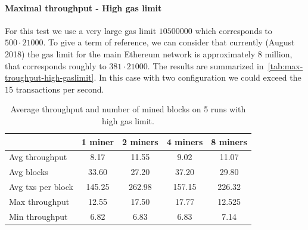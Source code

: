 \paragraph{Maximal throughput - High gas limit}
\label{sec:max-throughput-high-gaslimit}
For this test we use a very large gas limit $10500000$ which corresponds to $500
\cdot 21000$. To give a term of reference, we can consider that currently
(August 2018) the gas limit for the main Ethereum network is approximately $8$
million, that corresponds roughly to $381 \cdot 21000$. The results are
summarized in~\autoref{tab:max-troughput-high-gaslimit}. In this case with two
configuration we could exceed the $15$ transactions per second.

\begin{table}[h!]
  \centering
  \begin{tabular}{l | cccc}
    & 1 miner & 2 miners & 4 miners & 8 miners \\ \hline
    Avg throughput & 8.17 & 11.55 & 9.02 & 11.07 \\
    Avg blocks & 33.60 & 27.20 & 37.20 & 29.80 \\
    Avg txs per block & 145.25 & 262.98 & 157.15 & 226.32  \\
    Max throughput & 12.55 & 17.50 & 17.77 & 12.525 \\
    Min throughput & 6.82 & 6.83 & 6.83 & 7.14 \\
  \end{tabular}
  \caption{Average throughput and number of mined blocks on 5 runs with high gas limit.}
  \label{tab:max-troughput-high-gaslimit}
\end{table}
